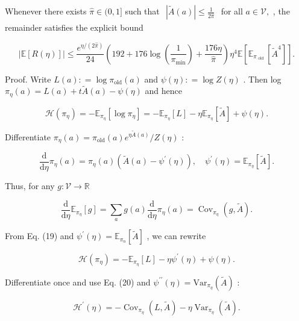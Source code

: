 \documentclass[
  10
]{article}
\begin{document}
Whenever there exists \({ \hat { \pi } } \in ( 0 , 1 ]\) such that
\(\begin{array} { r } { | \tilde { A } ( a ) | \le \frac { 1 } { 2 \hat { \pi } } } \end{array}\)
for all \(a \in \mathcal { V } ,\) , the remainder satisfies the
explicit bound

\[
\left| \mathbb {E} [ R (\eta) ] \right| \leq \frac {e ^ {\eta / (2 \hat {\pi})}}{2 4} \left(1 9 2 + 1 7 6 \log \left(\frac {1}{\pi_ {\min}}\right) + \frac {1 7 6 \eta}{\hat {\pi}}\right) \eta^ {4} \mathbb {E} \left[ \mathbb {E} _ {\pi_ {\text { old }}} [ \tilde {A} ^ {4} ] \right]. \tag {18}
\]

Proof. Write \(L ( a ) : = \log \pi _ { \mathrm { o l d } } ( a )\) and
\(\psi ( \eta ) : = \log Z ( \eta )\) . Then log
\(\pi _ { \eta } ( a ) = L ( a ) + t \tilde { A } ( a ) - \psi ( \eta )\)
and hence

\[
\mathcal {H} (\pi_ {\eta}) = - \mathbb {E} _ {\pi_ {\eta}} [ \log \pi_ {\eta} ] = - \mathbb {E} _ {\pi_ {\eta}} [ L ] - \eta \mathbb {E} _ {\pi_ {\eta}} [ \tilde {A} ] + \psi (\eta). \tag {19}
\]

Differentiate
\(\pi _ { \eta } ( a ) = \pi _ { \mathrm { o l d } } ( a ) e ^ { \eta \tilde { A } ( a ) } / Z ( \eta )\)
:

\[
\frac {\mathrm{d}}{\mathrm{d} \eta} \pi_ {\eta} (a) = \pi_ {\eta} (a) (\tilde {A} (a) - \psi^ {\prime} (\eta)), \quad \psi^ {\prime} (\eta) = \mathbb {E} _ {\pi_ {\eta}} [ \tilde {A} ].
\]

Thus, for any \(g : \mathcal { V } \to \mathbb { R }\)

\[
\frac {\mathrm{d}}{\mathrm{d} \eta} \mathbb {E} _ {\pi_ {\eta}} [ g ] = \sum_ {a} g (a) \frac {\mathrm{d}}{\mathrm{d} \eta} \pi_ {\eta} (a) = \operatorname{Cov} _ {\pi_ {\eta}} (g, \tilde {A}). \tag {20}
\]

From Eq. (19) and
\(\psi ^ { \prime } ( \eta ) = \mathbb { E } _ { \pi _ { n } } [ \tilde { A } ]\)
, we can rewrite

\[
\mathcal {H} (\pi_ {\eta}) = - \mathbb {E} _ {\pi_ {\eta}} [ L ] - \eta \psi^ {\prime} (\eta) + \psi (\eta).
\]

Differentiate once and use Eq. (20) and
\(\psi ^ { \prime \prime } ( \eta ) = \mathrm { V a r } _ { \pi _ { \eta } } ( \tilde { A } )\)
:

\[
\mathcal {H} ^ {\prime} (\eta) = - \operatorname{Cov} _ {\pi_ {\eta}} (L, \tilde {A}) - \eta \operatorname{Var} _ {\pi_ {\eta}} (\tilde {A}).
\]
\end{document}
